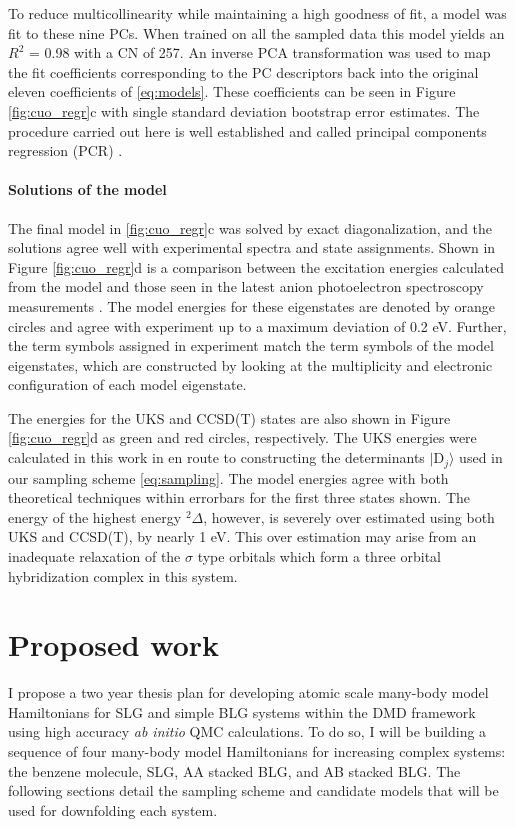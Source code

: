 \documentclass[12pt]{article}
\begin{document}
To reduce multicollinearity while maintaining a high goodness of fit, a model was fit to these nine PCs.
When trained on all the sampled data this model yields an $R^2$ = 0.98 with a CN of 257. 
An inverse PCA transformation was used to map the fit coefficients corresponding to the PC descriptors back into the original eleven coefficients of \eqref{eq:models}.
These coefficients can be seen in Figure \ref{fig:cuo_regr}c with single standard deviation bootstrap error estimates.
The procedure carried out here is well established and called principal components regression (PCR) \cite{10.2307/2348005}.

\vspace{-10pt}
\paragraph{Solutions of the model}
The final model in \ref{fig:cuo_regr}c was solved by exact diagonalization, and the solutions agree well with experimental spectra and state assignments.
Shown in Figure \ref{fig:cuo_regr}d is a comparison between the excitation energies calculated from the model and those seen in the latest anion photoelectron spectroscopy measurements \cite{Wu1997}.
The model energies for these eigenstates are denoted by orange circles and agree with experiment up to a maximum deviation of 0.2 eV.
Further, the term symbols assigned in experiment match the term symbols of the model eigenstates, which are constructed by looking at the multiplicity and electronic configuration of each model eigenstate. 

The energies for the UKS and CCSD(T) \cite{Xian2000} states are also shown in Figure \ref{fig:cuo_regr}d as green and red circles, respectively.
The UKS energies were calculated in this work in en route to constructing the determinants $|\text{D}_j\rangle$ used in our sampling scheme \eqref{eq:sampling}.
The model energies agree with both theoretical techniques within errorbars for the first three states shown.
The energy of the highest energy $^2\Delta$, however, is severely over estimated using both UKS and CCSD(T), by nearly 1 eV.
This over estimation may arise from an inadequate relaxation of the $\sigma$ type orbitals which form a three orbital hybridization complex in this system.

\section{Proposed work}
I propose a two year thesis plan for developing atomic scale many-body
model Hamiltonians for SLG and simple BLG systems within the DMD framework using high accuracy \textit{ab initio} QMC calculations.
To do so, I will be building a sequence of four many-body model Hamiltonians for increasing complex systems: the benzene molecule, SLG, AA stacked BLG, and AB stacked BLG.
The following sections detail the sampling scheme and candidate models that will be used for downfolding each system.
\end{document}
